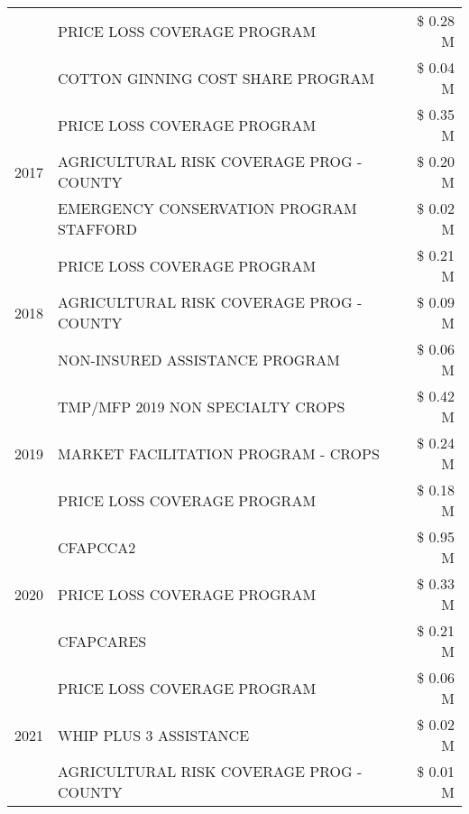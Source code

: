 \begin{tabular}{llr}
 & PRICE LOSS COVERAGE PROGRAM & \$ 0.28 M \\
 & COTTON GINNING COST SHARE PROGRAM & \$ 0.04 M \\
\cline{1-3}
\multirow[t]{3}{*}{2017} & PRICE LOSS COVERAGE PROGRAM & \$ 0.35 M \\
 & AGRICULTURAL RISK COVERAGE PROG - COUNTY & \$ 0.20 M \\
 & EMERGENCY CONSERVATION PROGRAM STAFFORD & \$ 0.02 M \\
\cline{1-3}
\multirow[t]{3}{*}{2018} & PRICE LOSS COVERAGE PROGRAM & \$ 0.21 M \\
 & AGRICULTURAL RISK COVERAGE PROG - COUNTY & \$ 0.09 M \\
 & NON-INSURED ASSISTANCE PROGRAM & \$ 0.06 M \\
\cline{1-3}
\multirow[t]{3}{*}{2019} & TMP/MFP 2019 NON SPECIALTY CROPS & \$ 0.42 M \\
 & MARKET FACILITATION PROGRAM - CROPS & \$ 0.24 M \\
 & PRICE LOSS COVERAGE PROGRAM & \$ 0.18 M \\
\cline{1-3}
\multirow[t]{3}{*}{2020} & CFAPCCA2 & \$ 0.95 M \\
 & PRICE LOSS COVERAGE PROGRAM & \$ 0.33 M \\
 & CFAPCARES & \$ 0.21 M \\
\cline{1-3}
\multirow[t]{3}{*}{2021} & PRICE LOSS COVERAGE PROGRAM & \$ 0.06 M \\
 & WHIP PLUS 3 ASSISTANCE & \$ 0.02 M \\
 & AGRICULTURAL RISK COVERAGE PROG - COUNTY & \$ 0.01 M \\
\cline{1-3}
\bottomrule
\end{tabular}
